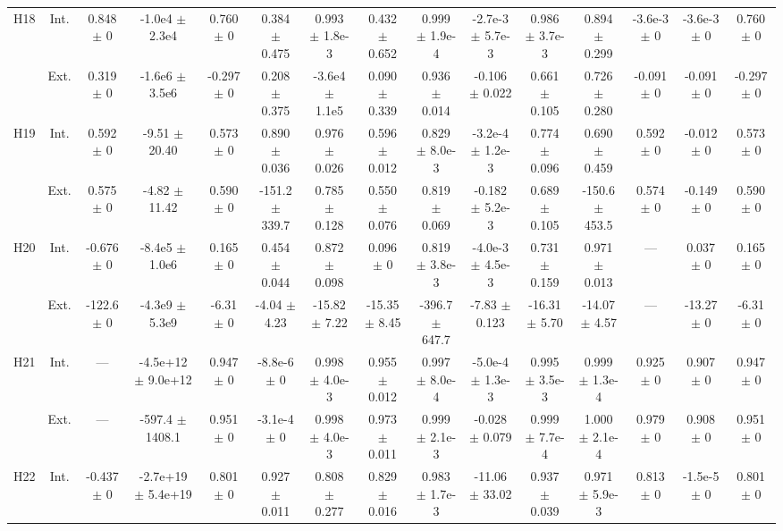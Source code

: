 \begin{table}[htbp]
{\begin{tabular}{@{}ccccccccccccccc@{}}
\cline{2-15}
\multirow{2}{*}{H18} & Int. & 0.848 $\pm$ 0 & -1.0e4 $\pm$ 2.3e4 & 0.760 $\pm$ 0 & 0.384 $\pm$ 0.475 & 0.993 $\pm$ 1.8e-3 & 0.432 $\pm$ 0.652 & 0.999 $\pm$ 1.9e-4 & -2.7e-3 $\pm$ 5.7e-3 & 0.986 $\pm$ 3.7e-3 & 0.894 $\pm$ 0.299 & -3.6e-3 $\pm$ 0 & -3.6e-3 $\pm$ 0 & 0.760 $\pm$ 0 \\
 & Ext. & 0.319 $\pm$ 0 & -1.6e6 $\pm$ 3.5e6 & -0.297 $\pm$ 0 & 0.208 $\pm$ 0.375 & -3.6e4 $\pm$ 1.1e5 & 0.090 $\pm$ 0.339 & 0.936 $\pm$ 0.014 & -0.106 $\pm$ 0.022 & 0.661 $\pm$ 0.105 & 0.726 $\pm$ 0.280 & -0.091 $\pm$ 0 & -0.091 $\pm$ 0 & -0.297 $\pm$ 0 \\
\cline{2-15}
\multirow{2}{*}{H19} & Int. & 0.592 $\pm$ 0 & -9.51 $\pm$ 20.40 & 0.573 $\pm$ 0 & 0.890 $\pm$ 0.036 & 0.976 $\pm$ 0.026 & 0.596 $\pm$ 0.012 & 0.829 $\pm$ 8.0e-3 & -3.2e-4 $\pm$ 1.2e-3 & 0.774 $\pm$ 0.096 & 0.690 $\pm$ 0.459 & 0.592 $\pm$ 0 & -0.012 $\pm$ 0 & 0.573 $\pm$ 0 \\
 & Ext. & 0.575 $\pm$ 0 & -4.82 $\pm$ 11.42 & 0.590 $\pm$ 0 & -151.2 $\pm$ 339.7 & 0.785 $\pm$ 0.128 & 0.550 $\pm$ 0.076 & 0.819 $\pm$ 0.069 & -0.182 $\pm$ 5.2e-3 & 0.689 $\pm$ 0.105 & -150.6 $\pm$ 453.5 & 0.574 $\pm$ 0 & -0.149 $\pm$ 0 & 0.590 $\pm$ 0 \\
\cline{2-15}
\multirow{2}{*}{H20} & Int. & -0.676 $\pm$ 0 & -8.4e5 $\pm$ 1.0e6 & 0.165 $\pm$ 0 & 0.454 $\pm$ 0.044 & 0.872 $\pm$ 0.098 & 0.096 $\pm$ 0 & 0.819 $\pm$ 3.8e-3 & -4.0e-3 $\pm$ 4.5e-3 & 0.731 $\pm$ 0.159 & 0.971 $\pm$ 0.013 & --- & 0.037 $\pm$ 0 & 0.165 $\pm$ 0 \\
 & Ext. & -122.6 $\pm$ 0 & -4.3e9 $\pm$ 5.3e9 & -6.31 $\pm$ 0 & -4.04 $\pm$ 4.23 & -15.82 $\pm$ 7.22 & -15.35 $\pm$ 8.45 & -396.7 $\pm$ 647.7 & -7.83 $\pm$ 0.123 & -16.31 $\pm$ 5.70 & -14.07 $\pm$ 4.57 & --- & -13.27 $\pm$ 0 & -6.31 $\pm$ 0 \\
\cline{2-15}
\multirow{2}{*}{H21} & Int. & --- & -4.5e+12 $\pm$ 9.0e+12 & 0.947 $\pm$ 0 & -8.8e-6 $\pm$ 0 & 0.998 $\pm$ 4.0e-3 & 0.955 $\pm$ 0.012 & 0.997 $\pm$ 8.0e-4 & -5.0e-4 $\pm$ 1.3e-3 & 0.995 $\pm$ 3.5e-3 & 0.999 $\pm$ 1.3e-4 & 0.925 $\pm$ 0 & 0.907 $\pm$ 0 & 0.947 $\pm$ 0 \\
 & Ext. & --- & -597.4 $\pm$ 1408.1 & 0.951 $\pm$ 0 & -3.1e-4 $\pm$ 0 & 0.998 $\pm$ 4.0e-3 & 0.973 $\pm$ 0.011 & 0.999 $\pm$ 2.1e-3 & -0.028 $\pm$ 0.079 & 0.999 $\pm$ 7.7e-4 & 1.000 $\pm$ 2.1e-4 & 0.979 $\pm$ 0 & 0.908 $\pm$ 0 & 0.951 $\pm$ 0 \\
\cline{2-15}
\multirow{2}{*}{H22} & Int. & -0.437 $\pm$ 0 & -2.7e+19 $\pm$ 5.4e+19 & 0.801 $\pm$ 0 & 0.927 $\pm$ 0.011 & 0.808 $\pm$ 0.277 & 0.829 $\pm$ 0.016 & 0.983 $\pm$ 1.7e-3 & -11.06 $\pm$ 33.02 & 0.937 $\pm$ 0.039 & 0.971 $\pm$ 5.9e-3 & 0.813 $\pm$ 0 & -1.5e-5 $\pm$ 0 & 0.801 $\pm$ 0 \\

\end{tabular}}
\end{table}
